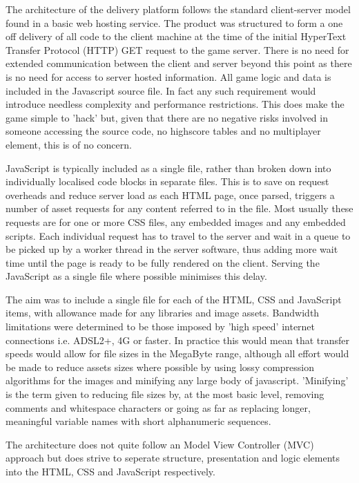 \documentclass[twoside]{bhamthesis}
\begin{document}
The architecture of the delivery platform follows the standard client-server model found in a basic web hosting service. The product was structured to form a one off delivery of all code to the client machine at the time of the initial HyperText Transfer Protocol (HTTP) GET request to the game server. There is no need for extended communication between the client and server beyond this point as there is no need for access to server hosted information. All game logic and data is included in the Javascript source file. In fact any such requirement would introduce needless complexity and performance restrictions. This does make the game simple to 'hack' but, given that there are no negative risks involved in someone accessing the source code, no highscore tables and no multiplayer element, this is of no concern.

JavaScript is typically included as a single file, rather than broken down into individually localised code blocks in separate files. This is to save on request overheads and reduce server load as each HTML page, once parsed, triggers a number of asset requests for any content referred to in the file. Most usually these requests are for one or more CSS files, any embedded images and any embedded scripts. Each individual request has to travel to the server and wait in a queue to be picked up by a worker thread in the server software, thus adding more wait time until the page is ready to be fully rendered on the client. Serving the JavaScript as a single file where possible minimises this delay.

The aim was to include a single file for each of the HTML, CSS and JavaScript items, with allowance made for any libraries and image assets. Bandwidth limitations were determined to be those imposed by 'high speed' internet connections i.e. ADSL2+, 4G or faster. In practice this would mean that transfer speeds would allow for file sizes in the MegaByte range, although all effort would be made to reduce assets sizes where possible by using lossy compression algorithms for the images and minifying any large body of javascript. 'Minifying' is the term given to reducing file sizes by, at the most basic level, removing comments and whitespace characters or going as far as replacing longer, meaningful variable names with short alphanumeric sequences.

The architecture does not quite follow an Model View Controller (MVC) approach but does strive to seperate structure, presentation and logic elements into the HTML, CSS and JavaScript respectively.
\end{document}
